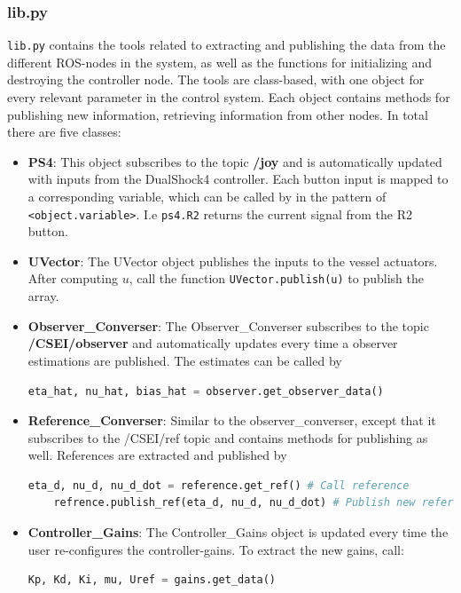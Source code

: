 \subsubsection{lib.py}
\lstinline{lib.py} contains the tools related to extracting and publishing the data from the different ROS-nodes in the system, as well as the functions for initializing and destroying the controller node. The tools are class-based, with one object for every relevant parameter in the control system. Each object contains methods for publishing new information, retrieving information from other nodes. In total there are five classes:
\begin{itemize}
    \item \textbf{PS4}: This object subscribes to the topic \textbf{/joy} and is automatically updated with inputs from the DualShock4 controller. Each button input is mapped to a corresponding variable, which can be called by in the pattern of \lstinline{<object.variable>}. I.e \lstinline{ps4.R2} returns the current signal from the R2 button.
    \item \textbf{UVector}:
    The UVector object publishes the inputs to the vessel actuators. After computing $u$, call the function \lstinline{UVector.publish(u)} to publish the array.
    \item \textbf{Observer\_Converser}:
    The Observer\_Converser subscribes to the topic \textbf{/CSEI/observer} and automatically updates every time a observer estimations are published. The estimates can be called by 
    \begin{lstlisting}[language=python,basicstyle=\mlttfamily, breaklines=true]
    eta_hat, nu_hat, bias_hat = observer.get_observer_data()
    \end{lstlisting}
    \item \textbf{Reference\_Converser}:
    Similar to the observer\_converser, except that it subscribes to the /CSEI/ref topic and contains methods for publishing as well. References are extracted and published by
     \begin{lstlisting}[language=python,basicstyle=\mlttfamily, breaklines=true]
    eta_d, nu_d, nu_d_dot = reference.get_ref() # Call reference
    refrence.publish_ref(eta_d, nu_d, nu_d_dot) # Publish new reference
    \end{lstlisting}
    \item \textbf{Controller\_Gains}:
    The Controller\_Gains object is updated every time the user re-configures the controller-gains. To extract the new gains, call:
     \begin{lstlisting}[language=python,basicstyle=\mlttfamily, breaklines=true]
    Kp, Kd, Ki, mu, Uref = gains.get_data()
    \end{lstlisting}
\end{itemize}

